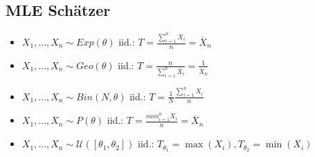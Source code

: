 \subsection{MLE Schätzer}
\begin{itemize}
	\item $X_1, ..., X_n \sim Exp(\theta)$ iid.: $T = \frac{\sum_{i=1}^nX_i}{n} = \overline{X}_n$
	\item $X_1, ..., X_n \sim Geo(\theta)$ iid.: $T = \frac{n}{\sum_{i=1}^n X_i} = \frac{1}{\overline{X}_n}$
	\item $X_1, ..., X_n \sim Bin(N, \theta)$ iid.: $T = \frac{1}{N}\frac{\sum_{i = 1}^n X_i}{n}$
	\item $X_1, ..., X_n \sim P(\theta)$ iid.: $T = \frac{sum_{i = 1}^n X_i}{n} = \overline{X}_n$
	\item $X_1, ..., X_n \sim \mathcal{U}([\theta_1, \theta_2])$ iid.: $T_{\theta_1} = \max(X_i), T_{\theta_2} = \min(X_i)$
\end{itemize}
\clearpage

